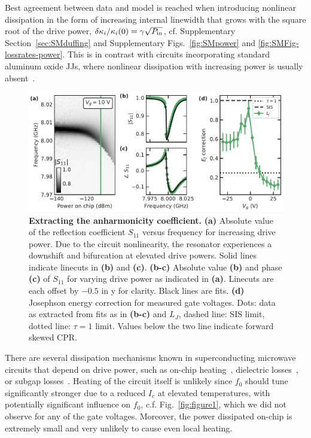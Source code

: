 Best agreement between data and model is reached when introducing nonlinear dissipation in the form of increasing internal linewidth that grows with the square root of the drive power, $\delta\kappa_i/\kappa_i(0)=\gamma \sqrt{P_{\rm in}}$, cf. Supplementary Section~\ref{sec:SMduffing} and Supplementary Figs.~\ref{fig:SMpower} and \ref{fig:SMFig-lossrates-power}.
%
This is in contrast with circuits incorporating standard aluminum oxide JJs, where nonlinear dissipation with increasing power is usually absent~\cite{boakninDispersiveMicrowaveBifurcation2007b}.

\begin{figure}[t]
	\centering
	\includegraphics[width=\linewidth]{chapter-gJJ-CPR/figs/Figure3}
	\caption{
		\textbf{Extracting the anharmonicity coefficient.}
		\textbf{(a)} Absolute value of the reflection coefficient $S_{11}$ versus frequency for increasing drive power.
		Due to the circuit nonlinearity, the resonator experiences a downshift and bifurcation at elevated drive powers.
		Solid lines indicate linecuts in \textbf{(b)} and \textbf{(c)}.
		\textbf{(b-c)} Absolute value \textbf{(b)} and phase \textbf{(c)} of $S_{11}$ for varying drive power as indicated in \textbf{(a)}.
		Linecuts are each offset by $-0.5$ in y for clarity.
		Black lines are fits.
		\textbf{(d)} Josephson energy correction for measured gate voltages.
		Dots: data as extracted from fits as in \textbf{(b-c)} and $L_J$, dashed line: SIS limit, dotted line: $\tau=1$ limit.
		Values below the two line indicate forward skewed CPR.
	}
	\label{fig:figure3}
\end{figure}

There are several dissipation mechanisms known in superconducting microwave circuits that depend on drive power, such as on-chip heating~\cite{portisPowerinducedSwitchingHTS1991,heinFundamentalLimitsLinear1997,wosikPowerHandlingCapabilities1997}, dielectric losses~\cite{martinisDecoherenceJosephsonQubits2005c,oconnellMicrowaveDielectricLoss2008a,gunnarssonDielectricLossesMultilayer2013,lisenfeldElectricFieldSpectroscopy2019}, or subgap losses~\cite{dassonnevilleDissipationSupercurrentFluctuations2013,ferrierPhasedependentAndreevSpectrum2013,dassonnevilleCoherenceenhancedPhasedependentDissipation2018}.
%
Heating of the circuit itself is unlikely since $f_0$ should tune significantly stronger due to a reduced $I_c$ at elevated temperatures, with potentially significant influence on $f_0$, c.f. Fig.~\ref{fig:figure1}, which we did not observe for any of the gate voltages.
%
Moreover, the power dissipated on-chip is extremely small and very unlikely to cause even local heating.

